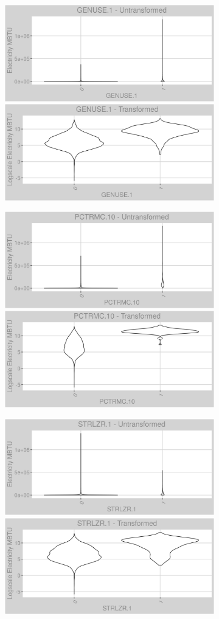 \FloatBarrier
\newpage
\begin{figure}
\centering
\begin{subfigure}{1\textwidth}
\centering
\includegraphics[width=.49\textwidth, height=0.3\textheight]{Images/electricity_var_original_18.png}
\includegraphics[width=.49\textwidth, height=0.3\textheight]{Images/electricity_var_transformed_18.png}
\end{subfigure}
\begin{subfigure}{1\textwidth}
\centering
\includegraphics[width=.49\textwidth, height=0.3\textheight]{Images/electricity_var_original_19.png}
\includegraphics[width=.49\textwidth, height=0.3\textheight]{Images/electricity_var_transformed_19.png}
\end{subfigure}
\begin{subfigure}{1\textwidth}
\centering
\includegraphics[width=.49\textwidth, height=0.3\textheight]{Images/electricity_var_original_20.png}
\includegraphics[width=.49\textwidth, height=0.3\textheight]{Images/electricity_var_transformed_20.png}
\end{subfigure}
\end{figure}